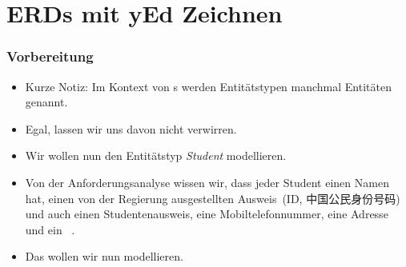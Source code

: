 \documentclass[aspectratio=169,mathserif,notheorems]{beamer}%
\begin{document}
\section{ERDs mit yEd Zeichnen}%
%
\begin{frame}%
\frametitle{Vorbereitung}%
\begin{itemize}%
%
\item Kurze Notiz: Im Kontext von s werden Entitätstypen manchmal Entitäten genannt.%
%
\item<2-> Egal, lassen wir uns davon nicht verwirren.%
%
\item<3-> Wir wollen nun den Entitätstyp \emph{Student} modellieren.%
%
\item<4-> Von der Anforderungsanalyse wissen wir, dass jeder Student einen Namen hat, einen von der Regierung ausgestellten Ausweis~(ID, 中国公民身份号码\cite{GB116431999CIN}) und auch einen Studentenausweis, eine Mobiltelefonnummer, eine Adresse und ein ~.%
%
\item<5-> Das wollen wir nun modellieren.%
\end{itemize}%
\end{frame}%
%
\end{document}
